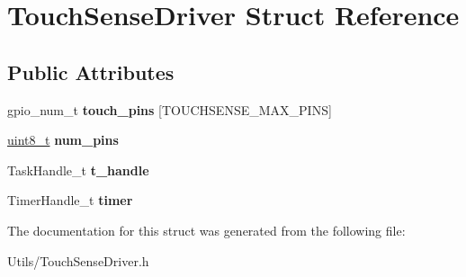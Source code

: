 \hypertarget{structTouchSenseDriver}{}\section{Touch\+Sense\+Driver Struct Reference}
\label{structTouchSenseDriver}
\subsection*{Public Attributes}
\begin{DoxyCompactItemize}
\item 
\mbox{\label{structTouchSenseDriver_a3fd5371d89f1eaf7cfb72ef10dfa1de3}} 
gpio\+\_\+num\+\_\+t {\bfseries touch\+\_\+pins} \mbox{[}T\+O\+U\+C\+H\+S\+E\+N\+S\+E\+\_\+\+M\+A\+X\+\_\+\+P\+I\+NS\mbox{]}
\item 
\mbox{\label{structTouchSenseDriver_aac16471c093be72b63e8b2e0dc48f791}} 
\hyperlink{vl53l0x__types_8h_aba7bc1797add20fe3efdf37ced1182c5}{uint8\+\_\+t} {\bfseries num\+\_\+pins}
\item 
\mbox{\label{structTouchSenseDriver_a0769e6c179073d6fd46560921521972b}} 
Task\+Handle\+\_\+t {\bfseries t\+\_\+handle}
\item 
\mbox{\label{structTouchSenseDriver_ab62b350c5ff94babe305db8db759a114}} 
Timer\+Handle\+\_\+t {\bfseries timer}
\end{DoxyCompactItemize}


The documentation for this struct was generated from the following file\+:\begin{DoxyCompactItemize}
\item 
Utils/Touch\+Sense\+Driver.\+h\end{DoxyCompactItemize}
